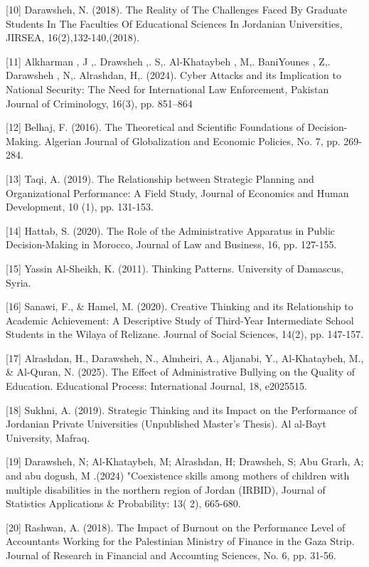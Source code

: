 \documentclass[10pt]{NSP1}
\begin{document}
[10] Darawsheh, N. (2018). The Reality of The Challenges Faced By Graduate Students In The Faculties Of Educational Sciences In Jordanian Universities, JIRSEA, 16(2),132-140,(2018).

[11] Alkharman , J ,. Drawsheh ,. S,. Al-Khataybeh , M,. BaniYounes , Z,. Darawsheh , N,. Alrashdan, H,. (2024). Cyber Attacks and its Implication to National Security: The Need for International Law Enforcement, Pakistan Journal of Criminology, 16(3), pp. 851--864

[12] Belhaj, F. (2016). The Theoretical and Scientific Foundations of Decision-Making. Algerian Journal of Globalization and Economic Policies, No. 7, pp. 269-284.

[13] Taqi, A. (2019). The Relationship between Strategic Planning and Organizational Performance: A Field Study, Journal of Economics and Human Development, 10 (1), pp. 131-153.

[14] Hattab, S. (2020). The Role of the Administrative Apparatus in Public Decision-Making in Morocco, Journal of Law and Business, 16, pp. 127-155.

[15] Yassin Al-Sheikh, K. (2011). Thinking Patterns. University of Damascus, Syria.

[16] Sanawi, F., \& Hamel, M. (2020). Creative Thinking and its Relationship to Academic Achievement: A Descriptive Study of Third-Year Intermediate School Students in the Wilaya of Relizane. Journal of Social Sciences, 14(2), pp. 147-157.

[17] Alrashdan, H., Darawsheh, N., Almheiri, A., Aljanabi, Y., Al-Khataybeh, M., \& Al-Quran, N. (2025). The Effect of Administrative Bullying on the Quality of Education. Educational Process: International Journal, 18, e2025515.

[18] Sukhni, A. (2019). Strategic Thinking and its Impact on the Performance of Jordanian Private Universities (Unpublished Master's Thesis). Al al-Bayt University, Mafraq.

[19] Darawsheh, N; Al-Khataybeh, M; Alrashdan, H; Drawsheh, S; Abu Grarh, A; and abu dogush, M .(2024) "Coexistence skills among mothers of children with multiple disabilities in the northern region of Jordan (IRBID), Journal of Statistics Applications \& Probability: 13( 2), 665-680.

[20] Rashwan, A. (2018). The Impact of Burnout on the Performance Level of Accountants Working for the Palestinian Ministry of Finance in the Gaza Strip. Journal of Research in Financial and Accounting Sciences, No. 6, pp. 31-56.
\end{document}
